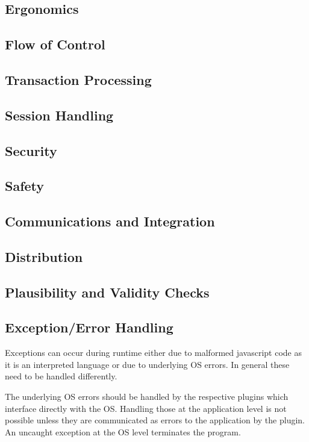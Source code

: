 \documentclass[]{article}
\begin{document}
\subsection{Ergonomics}

\subsection{Flow of Control}

\subsection{Transaction Processing}

\subsection{Session Handling}

\subsection{Security}

\subsection{Safety}

\subsection{Communications and Integration}

\subsection{Distribution}

\subsection{Plausibility and Validity Checks}

\subsection{Exception/Error Handling}

Exceptions can occur during runtime either due to malformed javascript code as it is an interpreted language or due to underlying OS errors. In general these need to be handled differently.

The underlying OS errors should be handled by the respective plugins which interface directly with the OS. Handling those at the application level is not possible unless they are communicated as errors to the application by the plugin. An uncaught exception at the OS level terminates the program.
\end{document}
